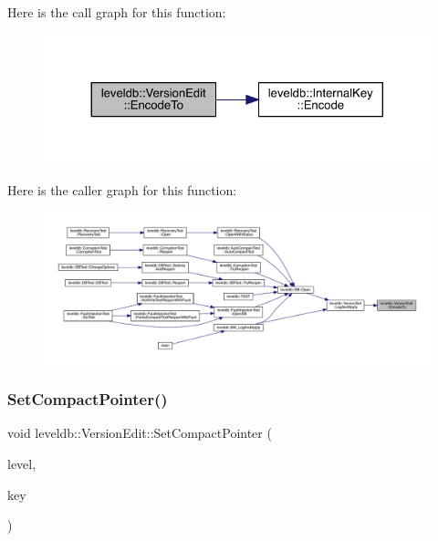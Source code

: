 Here is the call graph for this function\+:
\nopagebreak
\begin{figure}[H]
\begin{center}
\leavevmode
\includegraphics[width=324pt]{classleveldb_1_1_version_edit_af95009ddc020f72a32a1aa805bcf3a91_cgraph}
\end{center}
\end{figure}
Here is the caller graph for this function\+:
\nopagebreak
\begin{figure}[H]
\begin{center}
\leavevmode
\includegraphics[width=350pt]{classleveldb_1_1_version_edit_af95009ddc020f72a32a1aa805bcf3a91_icgraph}
\end{center}
\end{figure}
\mbox{\label{classleveldb_1_1_version_edit_ac9b26dfba1188705d7fc4deaf047271c}} 
\subsubsection{\texorpdfstring{SetCompactPointer()}{SetCompactPointer()}}
{\footnotesize\ttfamily void leveldb\+::\+Version\+Edit\+::\+Set\+Compact\+Pointer (\begin{DoxyParamCaption}\item[{int}]{level,  }\item[{const \mbox{\hyperlink{classleveldb_1_1_internal_key}{Internal\+Key}} \&}]{key }\end{DoxyParamCaption})\hspace{0.3cm}{\ttfamily [inline]}}

